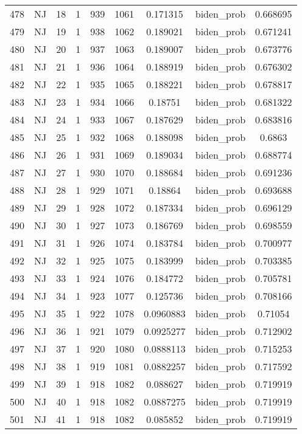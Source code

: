 \documentclass[12pt,a4paper]{article}
\begin{document}
\begin{tabular}{r|cccccccc}
	478 & NJ & 18 & 1 & 939 & 1061 & 0.171315 & biden\_prob & 0.668695 \\
	479 & NJ & 19 & 1 & 938 & 1062 & 0.189021 & biden\_prob & 0.671241 \\
	480 & NJ & 20 & 1 & 937 & 1063 & 0.189007 & biden\_prob & 0.673776 \\
	481 & NJ & 21 & 1 & 936 & 1064 & 0.188919 & biden\_prob & 0.676302 \\
	482 & NJ & 22 & 1 & 935 & 1065 & 0.188221 & biden\_prob & 0.678817 \\
	483 & NJ & 23 & 1 & 934 & 1066 & 0.18751 & biden\_prob & 0.681322 \\
	484 & NJ & 24 & 1 & 933 & 1067 & 0.187629 & biden\_prob & 0.683816 \\
	485 & NJ & 25 & 1 & 932 & 1068 & 0.188098 & biden\_prob & 0.6863 \\
	486 & NJ & 26 & 1 & 931 & 1069 & 0.189034 & biden\_prob & 0.688774 \\
	487 & NJ & 27 & 1 & 930 & 1070 & 0.188684 & biden\_prob & 0.691236 \\
	488 & NJ & 28 & 1 & 929 & 1071 & 0.18864 & biden\_prob & 0.693688 \\
	489 & NJ & 29 & 1 & 928 & 1072 & 0.187334 & biden\_prob & 0.696129 \\
	490 & NJ & 30 & 1 & 927 & 1073 & 0.186769 & biden\_prob & 0.698559 \\
	491 & NJ & 31 & 1 & 926 & 1074 & 0.183784 & biden\_prob & 0.700977 \\
	492 & NJ & 32 & 1 & 925 & 1075 & 0.183999 & biden\_prob & 0.703385 \\
	493 & NJ & 33 & 1 & 924 & 1076 & 0.184772 & biden\_prob & 0.705781 \\
	494 & NJ & 34 & 1 & 923 & 1077 & 0.125736 & biden\_prob & 0.708166 \\
	495 & NJ & 35 & 1 & 922 & 1078 & 0.0960883 & biden\_prob & 0.71054 \\
	496 & NJ & 36 & 1 & 921 & 1079 & 0.0925277 & biden\_prob & 0.712902 \\
	497 & NJ & 37 & 1 & 920 & 1080 & 0.0888113 & biden\_prob & 0.715253 \\
	498 & NJ & 38 & 1 & 919 & 1081 & 0.0882257 & biden\_prob & 0.717592 \\
	499 & NJ & 39 & 1 & 918 & 1082 & 0.088627 & biden\_prob & 0.719919 \\
	500 & NJ & 40 & 1 & 918 & 1082 & 0.0887275 & biden\_prob & 0.719919 \\
	501 & NJ & 41 & 1 & 918 & 1082 & 0.085852 & biden\_prob & 0.719919 \\

\end{tabular}
\end{document}
